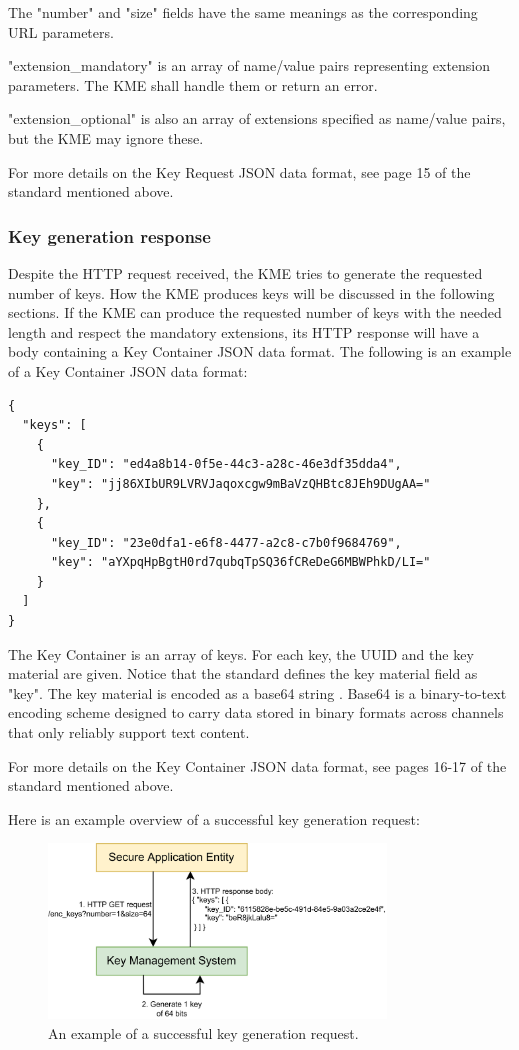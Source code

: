 The "number" and "size" fields have the same meanings as the corresponding URL parameters.

"extension\_mandatory" is an array of name/value pairs representing extension parameters. The KME shall handle them or return an error.

"extension\_optional" is also an array of extensions specified as name/value pairs, but the KME may ignore these.

For more details on the Key Request JSON data format, see page 15 of the standard mentioned above.

\subsubsection{Key generation response}
\label{kme:key_container}
Despite the HTTP request received, the KME tries to generate the requested number of keys. How the KME produces keys will be discussed in the following sections. If the KME can produce the requested number of keys with the needed length and respect the mandatory extensions, its HTTP response will have a body containing a Key Container JSON data format. The following is an example of a Key Container JSON data format:

\begin{verbatim}
{
  "keys": [
    {
      "key_ID": "ed4a8b14-0f5e-44c3-a28c-46e3df35dda4",
      "key": "jj86XIbUR9LVRVJaqoxcgw9mBaVzQHBtc8JEh9DUgAA="
    },
    {
      "key_ID": "23e0dfa1-e6f8-4477-a2c8-c7b0f9684769",
      "key": "aYXpqHpBgtH0rd7qubqTpSQ36fCReDeG6MBWPhkD/LI="
    }
  ]
}
\end{verbatim}

The Key Container is an array of keys. For each key, the UUID and the key material are given. Notice that the standard defines the key material field as "key". The key material is encoded as a base64 string \cite{base64}. Base64 is a binary-to-text encoding scheme designed to carry data stored in binary formats across channels that only reliably support text content.

For more details on the Key Container JSON data format, see pages 16-17 of the standard mentioned above.

Here is an example overview of a successful key generation request:
\begin{figure}[H]
    \centering
    \includegraphics[width=0.8\textwidth]{Images/get_key.png}
    \caption{An example of a successful key generation request.}
    \label{fig:get_key}
\end{figure}

